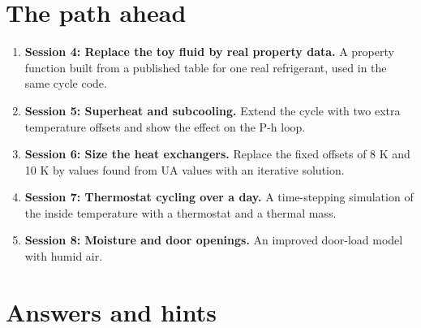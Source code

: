 \documentclass[11pt,a4paper]{article}
\begin{document}
\section{The path ahead}
\begin{enumerate}[nosep]
\item \textbf{Session 4: Replace the toy fluid by real property data.} A property function built from a published table for one real refrigerant, used in the same cycle code.
\item \textbf{Session 5: Superheat and subcooling.} Extend the cycle with two extra temperature offsets and show the effect on the P-h loop.
\item \textbf{Session 6: Size the heat exchangers.} Replace the fixed offsets of 8 K and 10 K by values found from UA values with an iterative solution.
\item \textbf{Session 7: Thermostat cycling over a day.} A time-stepping simulation of the inside temperature with a thermostat and a thermal mass.
\item \textbf{Session 8: Moisture and door openings.} An improved door-load model with humid air.
\end{enumerate}

\section{Answers and hints}
\end{document}
